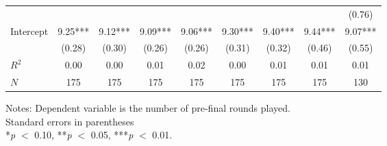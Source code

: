 \begin{table}[htbp]
\begin{threeparttable}
\begin{tabular}{l cccccccc}
                    &               &               &               &               &               &               &               &      (0.76)   \\
Intercept           &        9.25***&        9.12***&        9.09***&        9.06***&        9.30***&        9.40***&        9.44***&        9.07***\\
                    &      (0.28)   &      (0.30)   &      (0.26)   &      (0.26)   &      (0.31)   &      (0.32)   &      (0.46)   &      (0.55)   \\
\hline
$R^2$               &        0.00   &        0.00   &        0.01   &        0.02   &        0.00   &        0.01   &        0.01   &        0.01   \\
$N$                 &         175   &         175   &         175   &         175   &         175   &         175   &         175   &         130   \\
\hline
\hline
\end{tabular}
\begin{tablenotes}
\footnotesize
\item{Notes: Dependent variable is the number of pre-final                 rounds played. \\ Standard errors in parentheses                 \\ *\textit{p} $<$ 0.10, **\textit{p} $<$ 0.05, ***\textit{p} $<$ 0.01.}
\end{tablenotes}
\end{threeparttable}
\end{table}

